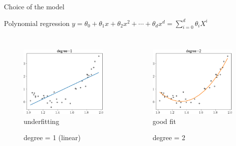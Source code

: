 \documentclass[handout]{beamer}
\begin{document}
\begin{frame}{Choice of the model}
\begin{block}{Polynomial regression}
$y=\theta_0 + \theta_1 x + \theta_2 x^2 + \cdots + \theta_d x^d = \sum_{i=0}^d \theta_i X^i$
\end{block}
\begin{columns}
    \begin{figure}
    \caption*{degree = 1 (linear)}
    \includegraphics[width=\textwidth]{fig/L1/interp-pol-1.png}\\
        underfitting

    \end{figure}
    \begin{figure}
    \caption*{degree = 2 }
    \includegraphics[width=\textwidth]{fig/L1/interp-pol-2.png}\\
        good fit


\end{figure}
\end{columns}
\end{frame}
\end{document}
